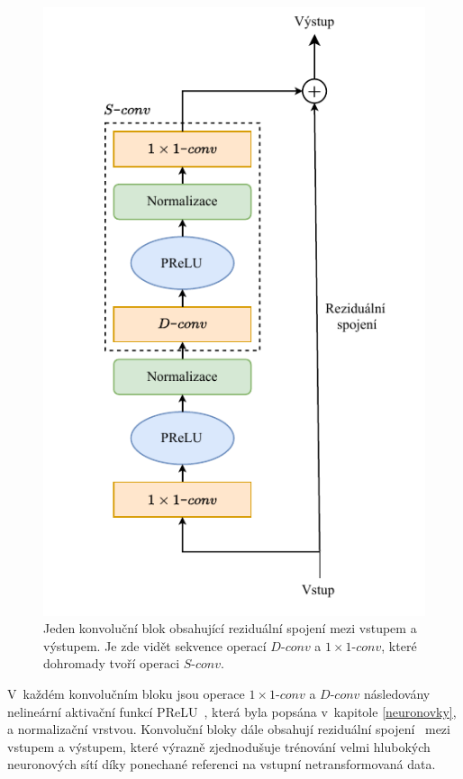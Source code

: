 \begin{figure}[H]
    \centering
    \includegraphics[scale=1.0]{obrazky-figures/conv-res-block.pdf}
    \caption{\label{fig:tasnet-convblock}Jeden konvoluční blok obsahující reziduální spojení mezi vstupem a výstupem. Je zde vidět sekvence operací $D\texttt{-}conv$ a $1 \times 1 \texttt{-}conv$, které dohromady tvoří operaci $S\texttt{-}conv$.}
\end{figure}

V~každém konvolučním bloku jsou operace $1 \times 1 \texttt{-}conv$ a $D\texttt{-}conv$ následovány nelineární aktivační funkcí PReLU~\cite{he2015delving}, která byla popsána v~kapitole \ref{neuronovky}, a normalizační vrstvou. Konvoluční bloky dále obsahují reziduální spojení~\cite{he2015deep} mezi vstupem a výstupem, které výrazně zjednodušuje trénování velmi hlubokých neuronových sítí díky ponechané referenci na vstupní netransformovaná data.


